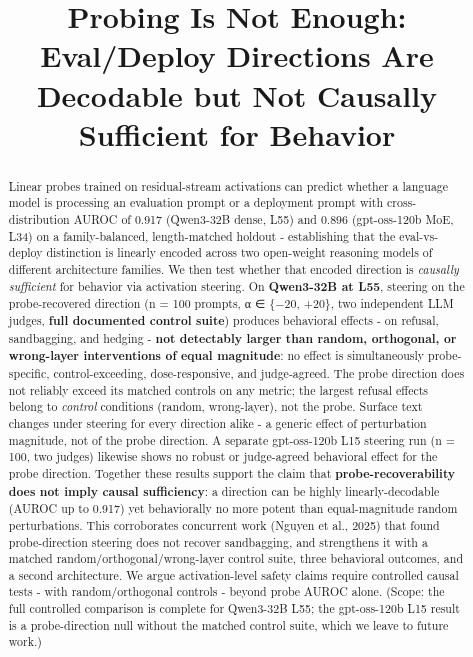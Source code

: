 \documentclass[
]{article}
\title{Probing Is Not Enough: Eval/Deploy Directions Are Decodable but
Not Causally Sufficient for Behavior}
\author{}
\date{}
\begin{document}
\maketitle
\begin{abstract}
Linear probes trained on residual-stream activations can predict whether
a language model is processing an evaluation prompt or a deployment
prompt with cross-distribution AUROC of 0.917 (Qwen3-32B dense, L55) and
0.896 (gpt-oss-120b MoE, L34) on a family-balanced, length-matched
holdout - establishing that the eval-vs-deploy distinction is linearly
encoded across two open-weight reasoning models of different
architecture families. We then test whether that encoded direction is
\emph{causally sufficient} for behavior via activation steering. On
\textbf{Qwen3-32B at L55}, steering on the probe-recovered direction (n
= 100 prompts, α ∈ \{−20, +20\}, two independent LLM judges,
\textbf{full documented control suite}) produces behavioral effects - on
refusal, sandbagging, and hedging - \textbf{not detectably larger than
random, orthogonal, or wrong-layer interventions of equal magnitude}: no
effect is simultaneously probe-specific, control-exceeding,
dose-responsive, and judge-agreed. The probe direction does not reliably
exceed its matched controls on any metric; the largest refusal effects
belong to \emph{control} conditions (random, wrong-layer), not the
probe. Surface text changes under steering for every direction alike - a
generic effect of perturbation magnitude, not of the probe direction. A
separate gpt-oss-120b L15 steering run (n = 100, two judges) likewise
shows no robust or judge-agreed behavioral effect for the probe
direction. Together these results support the claim that
\textbf{probe-recoverability does not imply causal sufficiency}: a
direction can be highly linearly-decodable (AUROC up to 0.917) yet
behaviorally no more potent than equal-magnitude random perturbations.
This corroborates concurrent work (Nguyen et al., 2025) that found
probe-direction steering does not recover sandbagging, and strengthens
it with a matched random/orthogonal/wrong-layer control suite, three
behavioral outcomes, and a second architecture.
We argue activation-level safety claims require controlled causal tests
- with random/orthogonal controls - beyond probe AUROC alone. (Scope:
the full controlled comparison is complete for Qwen3-32B L55; the
gpt-oss-120b L15 result is a probe-direction null without the matched
control suite, which we leave to future work.)
\end{abstract}
\end{document}

